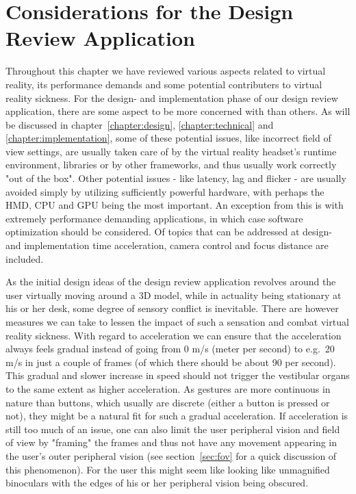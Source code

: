 \section{Considerations for the Design Review Application}
Throughout this chapter we have reviewed various aspects related to virtual reality, its performance demands and some potential contributers to virtual reality sickness. 
For the design- and implementation phase of our design review application, there are some aspect to be more concerned with than others. As will be discussed in chapter~\ref{chapter:design}, 
\ref{chapter:technical} and \ref{chapter:implementation}, some of these potential issues, like incorrect field of view settings, are usually taken care of by the 
virtual reality headset's runtime environment, libraries or by other frameworks, and thus usually work correctly "out of the box". 
Other potential issues - like latency, lag and flicker - are usually avoided simply by utilizing sufficiently powerful hardware, with perhaps the HMD, CPU and GPU 
being the most important. An exception from this is with extremely performance demanding applications, in which case software optimization should be considered.
Of topics that can be addressed at design- and implementation time acceleration, camera control and focus distance are included.  

As the initial design ideas of the design review application revolves around the user virtually moving around a 3D model, while in actuality being stationary at his or her
desk, some degree of sensory conflict is inevitable. There are however measures we can take to lessen the impact of such a sensation and combat virtual reality sickness.
With regard to acceleration we can ensure that the acceleration always feels gradual instead of going from 0 m/s (meter per second) to e.g.~20 m/s in just a couple of frames 
(of which there should be about 90 per second). This gradual and slower increase in speed should not trigger the vestibular organs to the same extent as higher acceleration.
As gestures are more continuous in nature than buttons, which usually are discrete (either a button is pressed or not), they might be a natural fit for such a gradual acceleration. 
If acceleration is still too much of an issue, one can also limit the user peripheral vision and field of view by "framing" the frames
and thus not have any movement appearing in the user's outer peripheral vision (see section~\vref{sec:fov} for a quick discussion of this phenomenon).
For the user this might seem like looking like unmagnified binoculars with the edges of his or her peripheral vision being obscured.  

